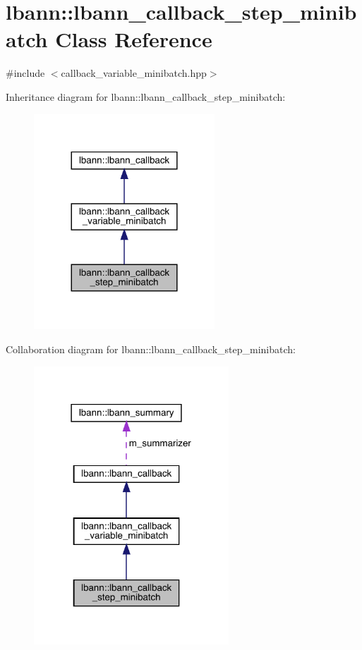 \hypertarget{classlbann_1_1lbann__callback__step__minibatch}{}\section{lbann\+:\+:lbann\+\_\+callback\+\_\+step\+\_\+minibatch Class Reference}
\label{classlbann_1_1lbann__callback__step__minibatch}


{\ttfamily \#include $<$callback\+\_\+variable\+\_\+minibatch.\+hpp$>$}



Inheritance diagram for lbann\+:\+:lbann\+\_\+callback\+\_\+step\+\_\+minibatch\+:\nopagebreak
\begin{figure}[H]
\begin{center}
\leavevmode
\includegraphics[width=192pt]{classlbann_1_1lbann__callback__step__minibatch__inherit__graph}
\end{center}
\end{figure}


Collaboration diagram for lbann\+:\+:lbann\+\_\+callback\+\_\+step\+\_\+minibatch\+:\nopagebreak
\begin{figure}[H]
\begin{center}
\leavevmode
\includegraphics[width=207pt]{classlbann_1_1lbann__callback__step__minibatch__coll__graph}
\end{center}
\end{figure}

